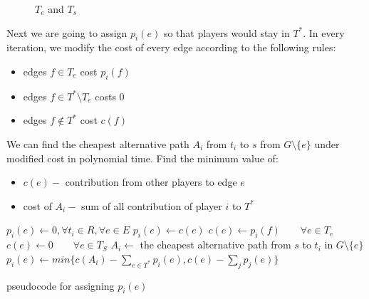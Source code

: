 \documentclass[11pt,psfig,times]{article}
\begin{document}
\begin{figure}
	\begin{center}
	\end{center}
	\caption{$T_e$ and $T_s$}
\end{figure}


Next we are going to assign \(p_i(e)\) so that players would stay in \(T^*\). In every iteration, we modify the cost of every edge according to the following rules:
\begin{itemize}
	\item edges \(f \in T_e\) cost \(p_i(f)\)
	\item edges \(f \in T^*\setminus T_e\) costs 0
	\item edges \(f\notin T^*\) cost \(c(f)\)
\end{itemize}
We can find the cheapest alternative path \(A_i\) from \(t_i\) to \(s\) from \(G \setminus \{e\}\) under modified cost in polynomial time. 
		Find the minimum value of:
		\begin{itemize}
			\item $c(e) - $ contribution from other players to edge \(e\)
			\item cost of \(A_i-\) sum of all contribution of player \(i\) to \(T^*\) 
		\end{itemize}
\begin{algorithm}[H]
	\begin{algorithmic}[1]
		\STATE $p_i(e) \gets 0, \forall t_i \in R, \forall e \in E$ 
		\STATE $p_i(e) \gets c(e)$
		\ELSE
		\STATE \(c(e) \gets p_i(f)  \qquad \forall e \in T_e\) 
		\STATE \(c(e) \gets 0 \qquad \forall e \in T_S\) 
		\STATE $A_i \gets$ the cheapest alternative path from \(s\) to \(t_i\) in $G\setminus\{e\}$ 
		\STATE \(p_i(e) \gets min\{c(A_i) - \sum_{e\in T^*}p_i(e), c(e)-\sum_{j}p_j(e) \}\)
		\ENDIF
		\ENDWHILE
	\end{algorithmic}
	\caption{pseudocode for assigning $p_i(e)$ }
	\label{alg:seq}
	\end{algorithm}
\end{document}
